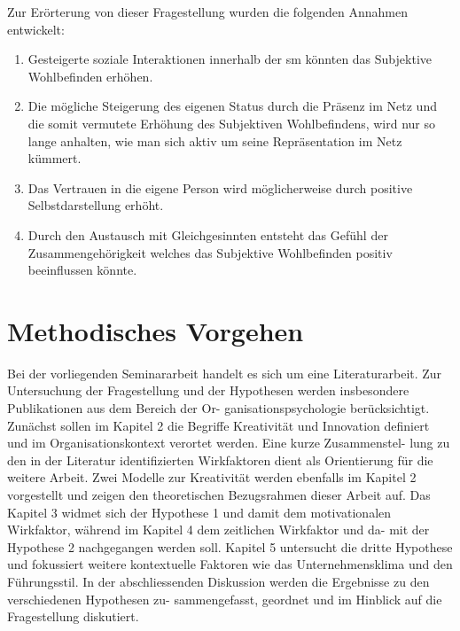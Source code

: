 Zur Erörterung von dieser Fragestellung wurden die folgenden Annahmen entwickelt:

\begin{enumerate}
\item Gesteigerte soziale Interaktionen innerhalb der \gls{sm} könnten das Subjektive Wohlbefinden erhöhen.
\item Die mögliche Steigerung des eigenen Status durch die Präsenz im Netz und die somit vermutete Erhöhung des Subjektiven Wohlbefindens, wird nur so lange anhalten, wie man sich aktiv um seine Repräsentation im Netz kümmert.
\item Das Vertrauen in die eigene Person wird möglicherweise durch positive Selbstdarstellung erhöht.
\item Durch den Austausch mit Gleichgesinnten entsteht das Gefühl der Zusammengehörigkeit welches das Subjektive Wohlbefinden positiv beeinflussen könnte.
\end{enumerate}

\section{Methodisches Vorgehen}\label{sec.vorgehen}

Bei der vorliegenden Seminararbeit handelt es sich um eine Literaturarbeit. Zur Untersuchung der Fragestellung und der Hypothesen werden insbesondere Publikationen aus dem Bereich der Or- ganisationspsychologie berücksichtigt. Zunächst sollen im Kapitel 2 die Begriffe Kreativität und Innovation definiert und im Organisationskontext verortet werden. Eine kurze Zusammenstel- lung zu den in der Literatur identifizierten Wirkfaktoren dient als Orientierung für die weitere Arbeit. Zwei Modelle zur Kreativität werden ebenfalls im Kapitel 2 vorgestellt und zeigen den theoretischen Bezugsrahmen dieser Arbeit auf. Das Kapitel 3 widmet sich der Hypothese 1 und damit dem motivationalen Wirkfaktor, während im Kapitel 4 dem zeitlichen Wirkfaktor und da- mit der Hypothese 2 nachgegangen werden soll. Kapitel 5 untersucht die dritte Hypothese und fokussiert weitere kontextuelle Faktoren wie das Unternehmensklima und den Führungsstil. In der abschliessenden Diskussion werden die Ergebnisse zu den verschiedenen Hypothesen zu- sammengefasst, geordnet und im Hinblick auf die Fragestellung diskutiert.

